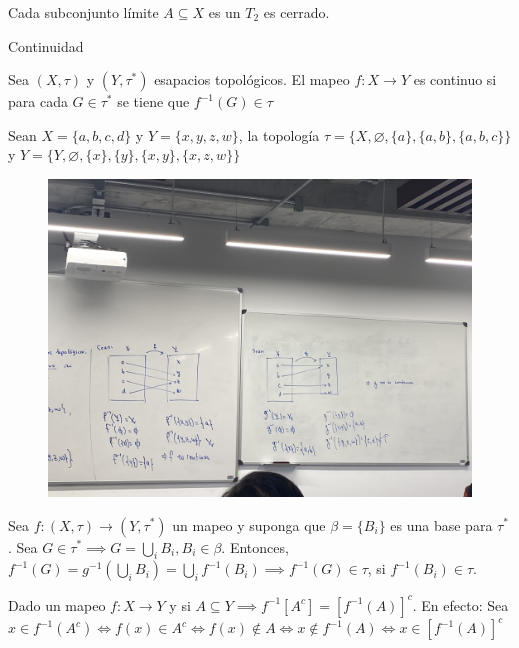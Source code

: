 \begin{teorema}
    Cada subconjunto límite $A\subseteq X$ es un $T_2$ es cerrado. 
\end{teorema}
Continuidad 
\begin{definicion}
    Sea $(X,\tau)$ y $(Y,\tau^*)$ esapacios topológicos. El mapeo $f:X\to Y$ es continuo si para cada $G\in \tau^*$ se tiene que $f^{-1}(G)\in\tau$
\end{definicion}

\begin{ejemplo}
    Sean $X=\{a,b,c,d\}$ y $Y=\{x,y,z,w\}$, la topología $\tau=\{X,\varnothing,\{a\},\{a,b\},\{a,b,c\}\}$ y $Y=\{Y,\varnothing, \{x\},\{y\}, \{x,y\},\{x,z,w\}\}$
    \begin{figure}[H]
        \centering
        \includegraphics[scale=0.2]{imagenes/ejemplos1.jpeg}
    \end{figure}
\end{ejemplo}

\begin{nota}
    Sea $f: (X,\tau)\to (Y,\tau^*)$ un mapeo y suponga que $\beta=\{B_i\}$ es una base para $\tau^*$. Sea $G\in \tau^*\implies G=\bigcup_{i}B_i,B_i\in\beta $. Entonces, $f^{-1}(G)=g^{-1}\left(\bigcup_iB_i\right)=\bigcup_i f^{-1}(B_i)\implies f^{-1}(G)\in \tau$, si $f^{-1}(B_i)\in \tau$. 
\end{nota}

\begin{nota}
    Dado un mapeo $f:X\to Y$ y si $A\subseteq Y\implies f^{-1}[A^c]=[f^{-1}(A)]^c$. En efecto: Sea $x\in f^{-1}(A^c)\iff f(x)\in A^c \iff f(x)\not\in A\iff x\not\in f^{-1}(A)\iff x\in [f^{-1}(A)]^c$
    
\end{nota}

